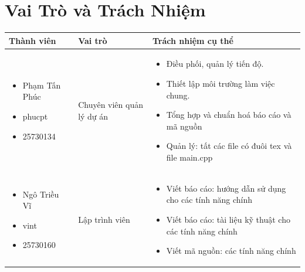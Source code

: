 \documentclass[12pt,a4paper]{article}
\begin{document}
\section{Vai Trò và Trách Nhiệm}
\noindent
\begin{table}[H]
\centering
\renewcommand{\arraystretch}{0.95} 
\begin{tabularx}{\textwidth}{|m{3.5cm}|m{2.5cm}|>{\arraybackslash}X|} 
\hline
\rowcolor{gray!15}
\textbf{Thành viên} & \textbf{Vai trò} & \textbf{Trách nhiệm cụ thể} \\ \hline

\begin{itemize}[leftmargin=*, nosep, before=\vspace{1pt}, after=\vspace{1pt}]
    \item Phạm Tấn Phúc
    \item phucpt
    \item 25730134
\end{itemize} & Chuyên viên quản lý dự án & 
\begin{itemize}[leftmargin=*, nosep, before=\vspace{1pt}, after=\vspace{1pt}]
    \item Điều phối, quản lý tiến độ.
    \item Thiết lập môi trường làm việc chung.
    \item Tổng hợp và chuẩn hoá báo cáo và mã nguồn
    \item Quản lý: tất các file có đuôi tex và file main.cpp
\end{itemize} \\ \hline

\begin{itemize}[leftmargin=*, nosep, before=\vspace{1pt}, after=\vspace{1pt}]
    \item Ngô Triều Vĩ
    \item vint
    \item 25730160
\end{itemize} & Lập trình viên & 
\begin{itemize}[leftmargin=*, nosep, before=\vspace{1pt}, after=\vspace{1pt}]
    \item Viết báo cáo: hướng dẫn sử dụng cho các tính năng chính
    \item Viết báo cáo: tài liệu kỹ thuật cho các tính năng chính
    \item Viết mã nguồn: các tính năng chính
\end{itemize} \\ \hline


\end{tabularx}
\end{table}
\end{document}
